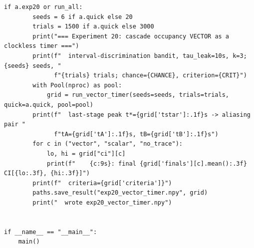 \begin{lstlisting}[caption={mrl\_trace/selectivity.py},label={lst:siox-src-selectivity}]
    if a.exp20 or run_all:
        seeds = 6 if a.quick else 20
        trials = 1500 if a.quick else 3000
        print("=== Experiment 20: cascade occupancy VECTOR as a clockless timer ===")
        print(f"  interval-discrimination bandit, tau_leak=10s, k=3; {seeds} seeds, "
              f"{trials} trials; chance={CHANCE}, criterion={CRIT}")
        with Pool(nproc) as pool:
            grid = run_vector_timer(seeds=seeds, trials=trials, quick=a.quick, pool=pool)
        print(f"  last-stage peak t*={grid['tstar']:.1f}s -> aliasing pair "
              f"tA={grid['tA']:.1f}s, tB={grid['tB']:.1f}s")
        for c in ("vector", "scalar", "no_trace"):
            lo, hi = grid["ci"][c]
            print(f"    {c:9s}: final {grid['finals'][c].mean():.3f}  CI[{lo:.3f}, {hi:.3f}]")
        print(f"  criteria={grid['criteria']}")
        paths.save_result("exp20_vector_timer.npy", grid)
        print("  wrote exp20_vector_timer.npy")


if __name__ == "__main__":
    main()
\end{lstlisting}

